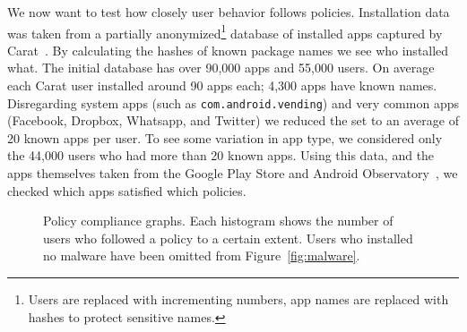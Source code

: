\documentclass[]{llncs}
\begin{document}
We now want to test how closely user behavior follows policies.
Installation data was taken from a partially anonymized\footnote{Users are replaced with incrementing numbers, app names are replaced with hashes to protect sensitive names.} database of installed apps captured by Carat~\cite{Oliner:2013ht}.
By calculating the hashes of known package names we see who installed what.
The initial database has over 90,000 apps and 55,000 users.
On average each Carat user installed around 90 apps each; 4,300 apps have known names.
Disregarding system apps (such as \texttt{com.android.vending}) and very common apps (Facebook, Dropbox, Whatsapp, and Twitter) we reduced the set to an average of 20 known apps per user.
To see some variation in app type, we considered only the 44,000 users who had more than 20 known apps.
Using this data, and the apps themselves taken from the Google Play Store and Android Observatory~\cite{Barrera:2012iba}, we checked which apps satisfied which policies.

\begin{figure}\centering
    \caption{Policy compliance graphs. Each histogram shows the number of users who followed a policy to a certain extent.  Users who installed no malware have been omitted from Figure~\autoref{fig:malware}.}
\end{figure}
\end{document}
